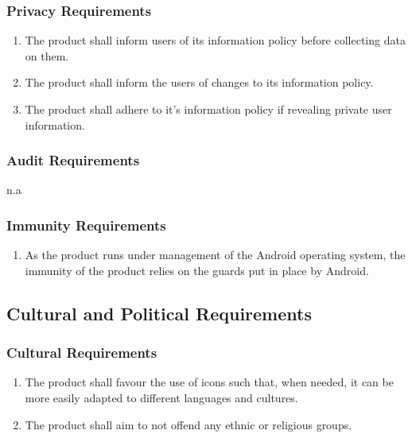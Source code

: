 \documentclass[]{article}
\begin{document}
\subsubsection{Privacy Requirements}
\label{ssub:privacy_requirements}
\begin{enumerate}[{SR}1. ]
	\resumeEnum
	\item The product shall inform users of its information policy before collecting data on them.
	\item The product shall inform the users of changes to its information policy.
	\item The product shall adhere to it's information policy if revealing private user information.
	\holdEnum
\end{enumerate}

\subsubsection{Audit Requirements}
\label{ssub:audit_requirements}
n.a

\subsubsection{Immunity Requirements}
\label{ssub:immunity_requirements}

\begin{enumerate}[{SR}1. ]
	\resumeEnum
	\item As the product runs under management of the Android operating system, the immunity of the product relies on the guards put in place by Android.
\end{enumerate}


\subsection{Cultural and Political Requirements}
\label{sub:cultural_and_political_requirements}

\subsubsection{Cultural Requirements}
\label{ssub:cultural_requirements}
\begin{enumerate}[{CP}1. ]
	\item The product shall favour the use of icons such that, when needed, it can be more easily adapted to different languages and cultures.
	\item The product shall aim to not offend any ethnic or religious groups.
	\holdEnum
\end{enumerate}
\end{document}
